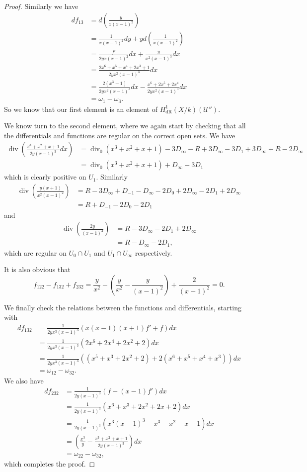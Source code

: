 \documentclass[draft, 11pt]{article} %
\theoremstyle{plain}
\theoremstyle{remark}
\newcommand{\cU}{{\mathcal U}}
\newcommand{\derhamhone}{H_{\text {dR}}^1(X/k)}
\DeclareMathOperator{\di}{div}
\begin{document}
\begin{proof}
Similarly we have
\begin{align}
df_{13} & = d \left( \frac{y}{x(x-1)^2} \right) \\
& = \frac{1}{x(x-1)^2}dy + y d \left( \frac{1}{x(x-1)^2} \right) \\
& = \frac{f'}{2yx(x-1)^2}dx + \frac{y}{x^2(x-1)^3}dx \\
& = \frac{2x^6 + x^5 + x^4 + 2x^3 + 1}{2yx^2(x-1)^3} dx\\
& = \frac{2(x^3-1)}{2yx^2(x-1)^3}dx - \frac{x^6 + 2x^5 + 2x^4}{2yx^2(x-1)^3}dx \\
& = \omega_1 - \omega_3.
\end{align}
So we know that our first element is an element of $\derhamhone (\cU'')$.

We know turn to the second element, where we again start by checking that all the differentials and functions are regular on the correct open sets.
We have
\begin{align}
\di \left( \frac{x^3 + x^2 + x + 1}{2y(x-1)^3} dx \right) & = \di_0(x^3 + x^2 + x + 1) - 3D_\infty - R + 3D_\infty - 3D_1 + 3D_\infty + R - 2D_\infty \\
& = \di_0(x^3 + x^2 + x + 1) + D_\infty - 3D_1
\end{align}
which is clearly positive on $U_1$.
Similarly
\begin{align}
\di \left( \frac{y(x+1)}{x^2(x-1)^2} \right) & = R - 3D_\infty + D_{-1} -D_\infty -2D_0 + 2D_\infty - 2D_1 + 2D_\infty \\
& = R + D_{-1} - 2D_0 - 2D_1
\end{align}
and
\begin{align}
\di \left( \frac{2y}{(x-1)^2} \right) & = R - 3D_\infty - 2D_1 + 2D_\infty \\
& = R - D_\infty - 2D_1,
\end{align}
which are regular on $U_0 \cap U_1$ and $U_1 \cap U_\infty$ respectively.

It is also obvious that
\[
f_{122} - f_{132} + f_{232} = \frac{y}{x^2} - \left( \frac{y}{x^2} - \frac{y}{(x-1)^2} \right) + \frac{2}{(x-1)^2} = 0.
\]

We finally check the relations between the functions and differentials, starting with
\begin{align}
df_{132} & = \frac{1}{2yx^3(x-1)^3} (x(x-1)(x+1)f' + f)dx \\
& = \frac{1}{2yx^3(x-1)^3}(2x^6 + 2x^4 + 2x^2 + 2)dx \\
& = \frac{1}{2yx^3(x-1)^3}((x^5 + x^3 + 2x^2 + 2) + 2(x^6 + x^5 + x^4 + x^3))dx \\
& = \omega_{12} - \omega_{32}.
\end{align}
We also have
\begin{align}
df_{232} & = \frac{1}{2y(x-1)^3}(f-(x-1)f')dx \\
& = \frac{1}{2y(x-1)^3}(x^6 + x^3 + 2x^2 + 2x+ 2)dx \\
& = \frac{1}{2y(x-1)^3}(x^3(x-1)^3 - x^3 - x^2 - x - 1) dx \\
& = \left(\frac{x^3}{y} - \frac{x^3 + x^2 + x+1}{2y(x-1)^3}\right) dx \\
& = \omega_{22} - \omega_{32},
\end{align}
which completes the proof.


\end{proof}
\end{document}
